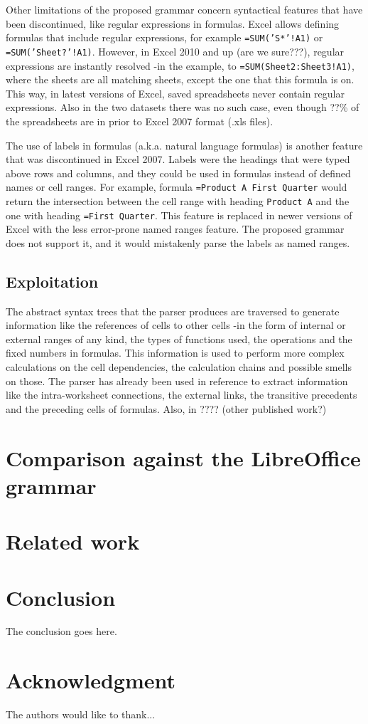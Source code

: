 \documentclass[conference]{IEEEtran}
\begin{document}
Other limitations of the proposed grammar concern syntactical features that have been discontinued, like regular expressions in formulas. Excel allows defining formulas that include regular expressions, for example \texttt{=SUM('S*'!A1)} or \texttt{=SUM('Sheet?'!A1)}. However, in Excel 2010 and up (are we sure???), regular expressions are instantly resolved -in the example, to \texttt{=SUM(Sheet2:Sheet3!A1)}, where the sheets are all matching sheets, except the one that this formula is on. This way, in latest versions of Excel, saved spreadsheets never contain regular expressions. Also in the two datasets there was no such case, even though ??\% of the spreadsheets are in prior to Excel 2007 format (.xls files). 

The use of labels in formulas (a.k.a. natural language formulas) is another feature that was discontinued in Excel 2007. Labels were the headings that were typed above rows and columns, and they could be used in formulas instead of defined names or cell ranges. For example, formula \texttt{=Product A First Quarter} would return the intersection between the cell range with heading \texttt{Product A} and the one with heading \texttt{=First Quarter}. This feature is replaced in newer versions of Excel with the less error-prone named ranges feature. The proposed grammar does not support it, and it would mistakenly parse the labels as named ranges.

\subsection{Exploitation}
The abstract syntax trees that the parser produces are traversed to generate information like the references of cells to other cells -in the form of internal or external ranges of any kind, the types of functions used, the operations and the fixed numbers in formulas. This information is used to perform more complex calculations on the cell dependencies, the calculation chains and possible smells on those. The parser has already been used in reference \cite{EnronVSEuses} to extract information like the intra-worksheet connections, the external links, the transitive precedents and the preceding cells of formulas. Also, in ???? (other published work?)

\section{Comparison against the LibreOffice grammar}

\section{Related work}

\section{Conclusion}
The conclusion goes here.


\section*{Acknowledgment}
The authors would like to thank...




\end{document}
